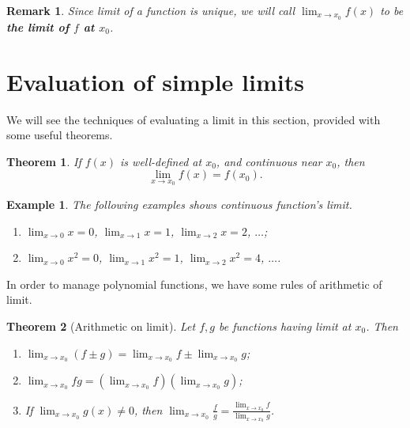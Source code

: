 \documentclass[12pt]{article}
\newtheorem*{theorem}{Theorem}
\newtheorem*{remark}{Remark}
\newtheorem*{example}{Example}
\begin{document}
    \begin{remark}
        Since limit of a function is unique, we will call $\lim_{x\to x_0}f(x)$ to be \textbf{the limit of $f$ at $x_0$}.
    \end{remark}

    \section{Evaluation of simple limits}

    We will see the techniques of evaluating a limit in this section, provided with some useful theorems.

    \begin{theorem}
        If $f(x)$ is well-defined at $x_0$, and continuous near $x_0$, then \[\lim_{x\to x_0}f(x)=f(x_0).\]
    \end{theorem}

    \begin{example}
        The following examples shows continuous function's limit.
        \begin{enumerate}
            \item $\lim_{x\to 0}x=0$, $\lim_{x\to 1}x=1$, $\lim_{x\to 2}x=2$, $\dots$;
            \item $\lim_{x\to 0}x^2=0$, $\lim_{x\to 1}x^2=1$, $\lim_{x\to 2}x^2=4$, $\dots$.
        \end{enumerate}
    \end{example}

    In order to manage polynomial functions, we have some rules of arithmetic of limit.

    \begin{theorem}[Arithmetic on limit]
        Let $f,g$ be functions having limit at $x_0$. Then\begin{enumerate}
            \item $\displaystyle\lim_{x\to x_0}(f\pm g)=\lim_{x\to x_0}f \pm \lim_{x\to x_0}g$;
            \item $\displaystyle\lim_{x\to x_0}fg = (\lim_{x\to x_0}f)(\lim_{x\to x_0}g)$;
            \item If $\displaystyle\lim_{x\to x_0}g(x)\neq 0$, then $\displaystyle\lim_{x\to x_0}\frac{f}{g}=\frac{\lim_{x\to x_0}f}{\lim_{x\to x_0}g}$.
        \end{enumerate}
    \end{theorem}
\end{document}
